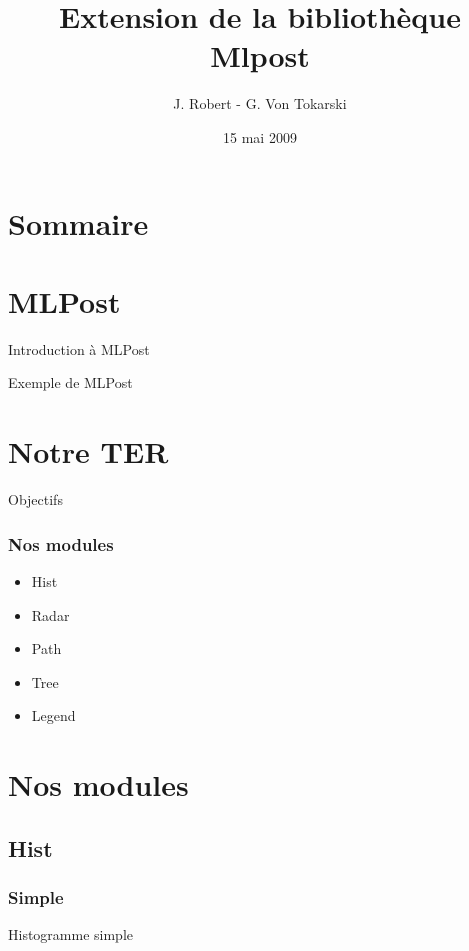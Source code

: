 \documentclass{beamer}
\title{Extension de la bibliothèque Mlpost}
\author{J. Robert - G. Von Tokarski}
\date{15 mai 2009}
\begin{document}
\begin{frame}
  \maketitle
\end{frame}

\section*{Sommaire}
\begin{frame}
  \tableofcontents
\end{frame}

\section{MLPost}
\begin{frame}{Introduction à MLPost}
\end{frame}

\begin{frame}{Exemple de MLPost}
\end{frame}

\section{Notre TER}
\begin{frame}{Objectifs}
\end{frame}

\begin{frame}
  \frametitle{Nos modules}
  \begin{itemize}
    \item<1-> Hist
    \item<2-> Radar
    \item<3-> Path
    \item<4-> Tree
    \item<5-> Legend
  \end{itemize}
\end{frame}

\section{Nos modules}
\subsection{Hist}
\subsubsection{Simple}
\begin{frame}{Histogramme simple}
\end{frame}
\end{document}
